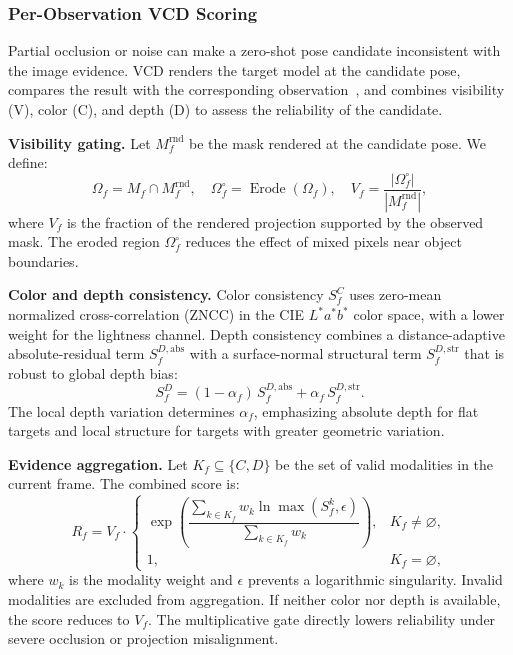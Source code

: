 \documentclass[review]{vgtc}
\begin{document}
\subsubsection{Per-Observation VCD Scoring}

Partial occlusion or noise can make a zero-shot pose candidate inconsistent with the image evidence. VCD renders the target model at the candidate pose, compares the result with the corresponding observation~\cite{deepim2018,latentfusion2020,focalpose2022}, and combines visibility (V), color (C), and depth (D) to assess the reliability of the candidate.

\textbf{Visibility gating.}
Let $M_f^{\mathrm{rnd}}$ be the mask rendered at the candidate pose. We define:
\begin{equation}
\Omega_f = M_f \cap M_f^{\mathrm{rnd}}, \quad \Omega_f^{\circ} = \operatorname{Erode}(\Omega_f), \quad V_f = \frac{|\Omega_f^{\circ}|}{|M_f^{\mathrm{rnd}}|},
\label{eq:visibility}
\end{equation}
where $V_f$ is the fraction of the rendered projection supported by the observed mask. The eroded region $\Omega_f^\circ$ reduces the effect of mixed pixels near object boundaries.

\textbf{Color and depth consistency.}
Color consistency $S_f^C$ uses zero-mean normalized cross-correlation (ZNCC) in the CIE $L^*a^*b^*$ color space, with a lower weight for the lightness channel. Depth consistency combines a distance-adaptive absolute-residual term $S_f^{D,\mathrm{abs}}$ with a surface-normal structural term $S_f^{D,\mathrm{str}}$ that is robust to global depth bias:
\begin{equation}
S_f^D = (1-\alpha_f)\,S_f^{D,\mathrm{abs}} + \alpha_f\,S_f^{D,\mathrm{str}}.
\label{eq:depth-score}
\end{equation}
The local depth variation determines $\alpha_f$, emphasizing absolute depth for flat targets and local structure for targets with greater geometric variation.

\textbf{Evidence aggregation.}
Let $K_f\subseteq\{C,D\}$ be the set of valid modalities in the current frame. The combined score is:
\begin{equation}
R_f = V_f \cdot
\begin{cases}
\exp\!\left(\dfrac{\sum_{k \in K_f} w_k \ln \max(S_f^{k}, \epsilon)}{\sum_{k \in K_f} w_k}\right), & K_f \neq \varnothing, \\[6pt]
1, & K_f = \varnothing,
\end{cases}
\label{eq:vcd}
\end{equation}
where $w_k$ is the modality weight and $\epsilon$ prevents a logarithmic singularity. Invalid modalities are excluded from aggregation. If neither color nor depth is available, the score reduces to $V_f$. The multiplicative gate directly lowers reliability under severe occlusion or projection misalignment.
\end{document}
